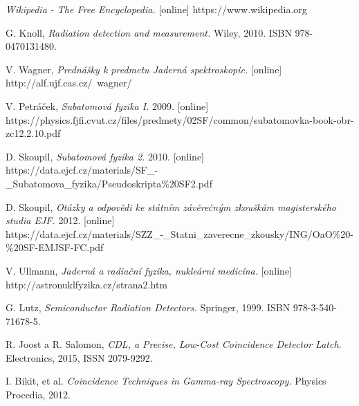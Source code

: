 \documentclass[12pt]{book}
\begin{document}




















\begin{thebibliography}{1}

 \textit{Wikipedia - The Free Encyclopedia.} [online] https://www.wikipedia.org

 G. Knoll, \textit{Radiation detection and measurement.} Wiley, 2010. ISBN 978-0470131480.

 V. Wagner, \textit{Prednášky k predmetu Jaderná spektroskopie.} [online] http://alf.ujf.cas.cz/~wagner/

 V. Petráček, \textit{Subatomová fyzika I.} 2009. [online] \\ https://physics.fjfi.cvut.cz/files/predmety/02SF/common/subatomovka-book-obr-zc12.2.10.pdf

 D. Skoupil, \textit{Subatomová fyzika 2.} 2010. [online] https://data.ejcf.cz/materials/SF\_-\_Subatomova\_fyzika/Pseudoskripta\%20SF2.pdf

 D. Skoupil, \textit{Otázky a odpovědi ke státním závěrečným zkouškám magisterského studia EJF.} 2012. [online] \\https://data.ejcf.cz/materials/SZZ\_-\_Statni\_zaverecne\_zkousky/ING/OaO\%20-\%20SF-EMJSF-FC.pdf

 V. Ullmann, \textit{Jaderná a radiační fyzika, nukleární medicína.} [online] \\http://astronuklfyzika.cz/strana2.htm

 G. Lutz, \textit{Semiconductor Radiation Detectors.} Springer, 1999. ISBN 978-3-540-71678-5.

 R. Joost a R. Salomon, \textit{CDL, a Precise, Low-Cost Coincidence Detector Latch.} Electronics, 2015, ISSN 2079-9292.

 I. Bikit, et al. \textit{Coincidence Techniques in Gamma-ray Spectroscopy.} Physics Procedia, 2012.


\end{thebibliography}
\end{document}
